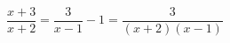 \begin{ex}[type=equation]
	\begin{condition}
		$\dfrac{x + 3}{x + 2} = \dfrac{3}{x - 1} - 1 = \dfrac{3}{(x + 2)(x - 1)}$
	\end{condition}
\end{ex}